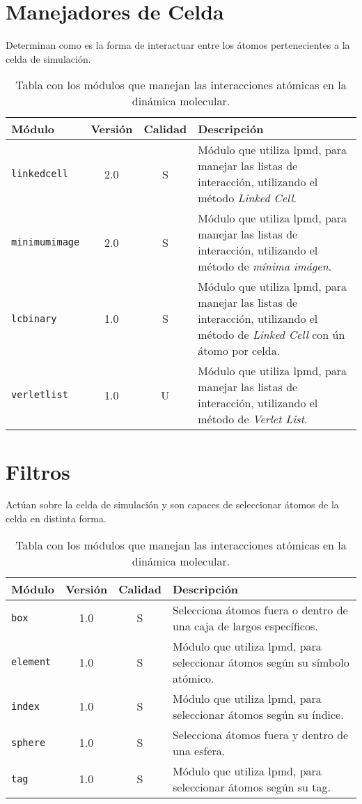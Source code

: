 \section{Manejadores de Celda}
Determinan como es la forma de interactuar entre los \'atomos pertenecientes a la celda de simulaci\'on.

\begin{table}[h!]\centering
 \begin{tabular}{|l|c|c|p{10cm}|}\hline
 M\'odulo & Versi\'on & Calidad & Descripci\'on \\
 \hline\hline
 \texttt{linkedcell} & 2.0 & S & M\'odulo que utiliza lpmd, para manejar las listas de interacci\'on, utilizando el m\'etodo \textit{Linked Cell}.\\
 \hline
 \texttt{minimumimage} & 2.0 & S & M\'odulo que utiliza lpmd, para manejar las listas de interacci\'on, utilizando el m\'etodo de \textit{m\'inima im\'agen}.\\
 \hline
 \texttt{lcbinary} & 1.0 & S & M\'odulo que utiliza lpmd, para manejar las listas de interacci\'on, utilizando el m\'etodo de \textit{Linked Cell} con \'un \'atomo por celda.\\
 \hline
 \texttt{verletlist} & 1.0 & U & M\'odulo que utiliza lpmd, para manejar las listas de interacci\'on, utilizando el m\'etodo de \textit{Verlet List}.\\
 \hline
 \end{tabular}
\label{tab:modmanager}
\caption{Tabla con los m\'odulos que manejan las interacciones at\'omicas en la din\'amica molecular.}
\end{table}

\section{Filtros}
Act\'uan sobre la celda de simulaci\'on y son capaces de seleccionar \'atomos de la celda en distinta forma.

\begin{table}[h!]\centering
 \begin{tabular}{|l|c|c|p{10cm}|}\hline
 M\'odulo & Versi\'on & Calidad & Descripci\'on \\
 \hline\hline
 \texttt{box} & 1.0 & S & Selecciona \'atomos fuera o dentro de una caja de largos espec\'ificos.\\
 \hline
 \texttt{element} & 1.0 & S & M\'odulo que utiliza lpmd, para seleccionar \'atomos seg\'un su s\'imbolo at\'omico.\\
 \hline
 \texttt{index} & 1.0 & S & M\'odulo que utiliza lpmd, para seleccionar \'atomos seg\'un su \'indice.\\
 \hline
 \texttt{sphere} & 1.0 & S & Selecciona \'atomos fuera y dentro de una esfera.\\
 \hline
 \texttt{tag} & 1.0 & S & M\'odulo que utiliza lpmd, para seleccionar \'atomos seg\'un su tag.\\
 \hline
 \end{tabular}
\label{tab:filtros}
\caption{Tabla con los m\'odulos que manejan las interacciones at\'omicas en la din\'amica molecular.}
\end{table}


